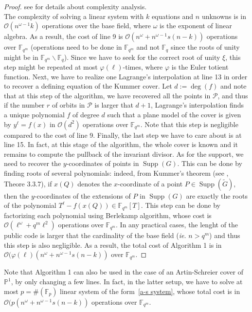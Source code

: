 \documentclass[10pt]{article}
\theoremstyle{definition}
\theoremstyle{definition}
\theoremstyle{definition}
\newcommand{\PP}{\mathbb{P}}
\newcommand{\calO}{\mathcal{O}}
\newcommand{\fqm}{\mathbb{F}_{q^m}}
\newcommand{\fq}{\mathbb{F}_q}
\newcommand{\w}{\omega}
\newcommand{\PR}{\mathcal{P}}
\newcommand{\Supp}{\operatorname{Supp}}
\begin{document}
\begin{proof} see \cite{CF} for details about complexity analysis. \\
The complexity of solving a linear system with $k$ equations and $n$ unknowns is in $\calO(n^{\w-1}k)$ operations over the base field, where $\w$ is the exponent of linear algebra. As a result, the cost of line 9 is $\calO(n^{\w}+n^{\w-1}s(n-k))$ operations over $\fqm$ (operations need to be done in $\fqm$ and not $\fq$ since the roots of unity might be in $\fqm \backslash \fq$). Since we have to seek for the correct root of unity $\xi$, this step might be repeated at most $\varphi(\ell)$-times, where $\varphi$ is the Euler totient function. Next, we have to realize one Lagrange's interpolation at line 13 in order to recover a defining equation of the Kummer cover. Let $d:=\deg(f)$ and note that at this step of the algorithm, we have recovered all the points in $\PR$, and thus if the number $r$ of orbits in $\PR$ is larger that $d+1$, Lagrange's interpolation finds a unique polynomial $f$ of degree $d$ such that a plane model of the cover is given by $y^{\ell}=f(x)$ in $\calO(d^2)$ operations over $\fqm$. Note that this step is negligible compared to the cost of line 9. Finally, the last step we have to care about is at line 15. In fact, at this stage of the algorithm, the whole cover is known and it remains to compute the pullback of the invariant divisor. As for the support, we need to recover the $y$-coordinates of points in $\Supp(G)$. This can be done by finding roots of several polynomials: indeed, from Kummer's theorem (see \cite{Sti}, Theore 3.3.7), if $x(Q)$ denotes the $x$-coordinate of a point $P \in \Supp(\tilde{G})$, then the $y$-coordinates of the extensions of $P$ in $\Supp(G)$ are exactly the roots of the polynomial $T^{\ell}-f(x(Q)) \in \fqm[T]$. This step can be done by factorizing each polynomial using Berlekamp algorithm, whose cost is $\calO(\ell^{\w}+q^m\ell^{2})$ operations over $\fqm$. In any practical cases, the lenght of the public code is larger that the cardinality of the base field (\textit{ie.} $n > q^m$) and thus this step is also negligible. As a result, the total cost of Algorithm 1 is in $\calO(\varphi(\ell)(n^{\w}+n^{\w-1}s(n-k))$ over $\fqm$.
\end{proof}

Note that Algorithm 1 can also be used in the case of an Artin-Schreier cover of $\PP^1$, by only changing a few lines. In fact, in the latter setup, we have to solve at most $p = \#(\mathbb{F}_p)$ linear system of the form~\eqref{a-s system}, whose total cost is in $\calO(p(n^{\w}+n^{\w-1}s(n-k))$ operations over $\fqm$.
\end{document}
